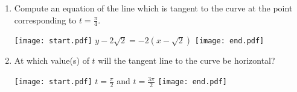\documentclass[12pt]{article}
\begin{document}
\begin{enumerate}
\begin{enumerate}
\item Compute an equation of the line which is tangent to the curve at the point corresponding to $t=\frac{\pi}{4}$.

\texttt{[image: start.pdf]}
{{$y-2\sqrt{2}=-2\left(x-\sqrt{2}\right)$}}
\texttt{[image: end.pdf]}


\item At which value(s) of $t$ will the tangent line to the curve be horizontal?

\texttt{[image: start.pdf]}
{{$t=\frac{\pi}{2}$ and $t=\frac{3\pi}{2}$}}
\texttt{[image: end.pdf]}


\end{enumerate}

\end{enumerate}

\end{document}
